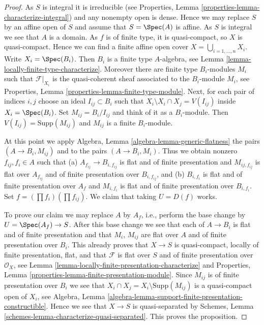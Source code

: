 \begin{proof}
As $S$ is integral it is irreducible (see
Properties, Lemma \ref{properties-lemma-characterize-integral})
and any nonempty open is dense. Hence we may replace
$S$ by an affine open of $S$ and assume that $S = \Spec(A)$ is
affine. As $S$ is integral we see that $A$ is a domain.
As $f$ is of finite type, it is quasi-compact, so $X$ is quasi-compact.
Hence we can find a finite affine open cover
$X = \bigcup_{i = 1, \ldots, n} X_i$. Write $X_i = \Spec(B_i)$.
Then $B_i$ is a finite type $A$-algebra, see
Lemma \ref{lemma-locally-finite-type-characterize}.
Moreover there are finite type
$B_i$-modules $M_i$ such that $\mathcal{F}|_{X_i}$ is the
quasi-coherent sheaf associated to the $B_i$-module $M_i$, see
Properties, Lemma \ref{properties-lemma-finite-type-module}.
Next, for each pair of indices $i, j$ choose an ideal $I_{ij} \subset B_i$
such that $X_i \setminus X_i \cap X_j = V(I_{ij})$ inside
$X_i = \Spec(B_i)$. Set $M_{ij} = B_i/I_{ij}$ and think
of it as a $B_i$-module. Then $V(I_{ij}) = \text{Supp}(M_{ij})$
and $M_{ij}$ is a finite $B_i$-module.

\medskip\noindent
At this point we apply
Algebra, Lemma \ref{algebra-lemma-generic-flatness}
the pairs $(A \to B_i, M_{ij})$ and to the
pairs $(A \to B_i, M_i)$. Thus we obtain
nonzero $f_{ij}, f_i \in A$ such that (a) $A_{f_{ij}} \to B_{i, f_{ij}}$
is flat and of finite presentation and $M_{ij, f_{ij}}$ is flat
over $A_{f_{ij}}$ and of finite presentation over $B_{i, f_{ij}}$, and
(b) $B_{i, f_i}$ is flat and of finite presentation over $A_f$ and
$M_{i, f_i}$ is flat and of finite presentation over $B_{i, f_i}$. Set
$f = (\prod f_i) (\prod f_{ij})$.
We claim that taking $U = D(f)$ works.

\medskip\noindent
To prove our claim we may replace $A$ by $A_f$, i.e.,
perform the base change by $U = \Spec(A_f) \to S$.
After this base change we see that each of $A \to B_i$ is
flat and of finite presentation and that $M_i$, $M_{ij}$ are flat over $A$
and of finite presentation over $B_i$.
This already proves that $X \to S$ is quasi-compact,
locally of finite presentation, flat, and that $\mathcal{F}$
is flat over $S$ and of finite presentation over $\mathcal{O}_X$, see
Lemma \ref{lemma-locally-finite-presentation-characterize}
and
Properties, Lemma \ref{properties-lemma-finite-presentation-module}.
Since $M_{ij}$ is of finite presentation over $B_i$ we see that
$X_i \cap X_j = X_i \setminus \text{Supp}(M_{ij})$ is a quasi-compact
open of $X_i$, see
Algebra, Lemma \ref{algebra-lemma-support-finite-presentation-constructible}.
Hence we see that $X \to S$ is quasi-separated by
Schemes, Lemma \ref{schemes-lemma-characterize-quasi-separated}.
This proves the proposition.
\end{proof}

